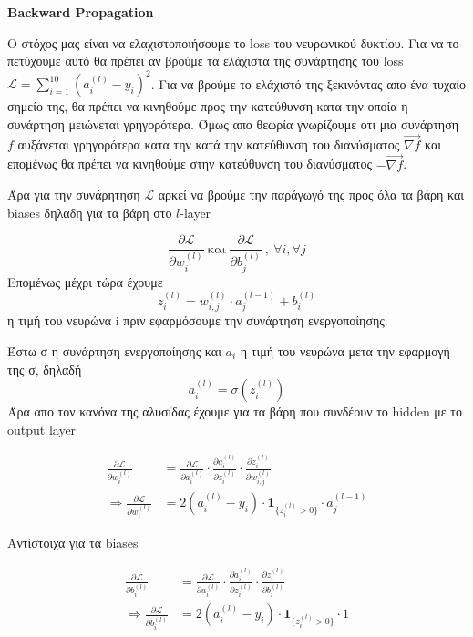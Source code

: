 \documentclass[a4paper,12pt]{article}
\begin{document}
\newpage
\section*{}
\begin{center}
    \Large \textbf{Backward Propagation}
\end{center}

Ο στόχος μας είναι να ελαχιστοποιήσουμε το loss του νευρωνικού δυκτίου. Για να το πετύχουμε αυτό θα πρέπει αν βρούμε τα ελάχιστα της συνάρτησης του loss $\mathcal{L} = \sum_{i=1}^{10} (a_i^{(l)} - y_i)^2$. Για να βρούμε το ελάχιστό της ξεκινόντας απο ένα τυχαίο σημείο της, θα πρέπει να κινηθούμε προς την κατεύθυνση κατα την οποία η συνάρτηση μειώνεται γρηγορότερα.  Όμως απο θεωρία γνωρίζουμε οτι μια συνάρτηση $f$ αυξάνεται γρηγορότερα κατα την κατά την κατεύθυνση του διανύσματος $\overrightarrow{\nabla f}$ και επομένως θα πρέπει να κινηθούμε στην κατεύθυνση του διανύσματος $-\overrightarrow{\nabla f}$. 

Άρα για την συνάρητηση $\mathcal{L}$ αρκεί να βρούμε την παράγωγό της προς όλα τα βάρη και biases δηλαδη για τα βάρη στο $l$-layer

$$
\frac{\partial \mathcal{L}}{\partial w_{i}^{(l)}}  \    \text{και} \  \frac{\partial \mathcal{L}}{\partial b_{j}^{(l)}}
\ , \ \forall i , \forall j
$$
Επομένως μέχρι τώρα έχουμε
\[
z_{i}^{(l)} = w_{i,j}^{(l)} \cdot a_{j}^{(l-1)} + b_{i}^{(l)}
\]
η τιμή του νευρώνα i πριν εφαρμόσουμε την συνάρτηση ενεργοποίησης.

Έστω σ η συνάρτηση ενεργοποίησης και $a_i$ η τιμή του νευρώνα μετα την εφαρμογή της σ, δηλαδή
\[
a_{i}^{(l)} = σ(z_{i}^{(l)})
\]
Άρα απο τον κανόνα της αλυσίδας έχουμε για τα βάρη που συνδέουν το hidden με το output layer

\begin{align}
\frac{\partial \mathcal{L}}{\partial w_{i}^{(l)}}  &= \frac{\partial \mathcal{L}}{\partial a_{i}^{(l)}}  \cdot \frac{\partial a_{i}^{(l)}}{\partial z_{i}^{(l)}}  \cdot \frac{\partial z_{i}^{(l)}}{\partial w_{i,j}^{(l)}} \label{eq:grad_weight_l1} \\
\Rightarrow \frac{\partial \mathcal{L}}{\partial w_{i}^{(l)}} &= 2(a_i^{(l)} - y_{i}) \cdot \mathbf{1}_{\{z_{i}^{(l)}>0\} } \cdot a_{j}^{(l-1)} \label{eq:grad_weight_l2}
\end{align}

Αντίστοιχα για τα biases

\begin{align}
\frac{\partial \mathcal{L}}{\partial b_{i}^{(l)}}  &= \frac{\partial \mathcal{L}}{\partial a_{i}^{(l)}}  \cdot \frac{\partial a_{i}^{(l)}}{\partial z_{i}^{(l)}}  \cdot \frac{\partial z_{i}^{(l)}}{\partial b_{i}^{(l)}} \label{eq:grad_bias_l1} \\
\Rightarrow \frac{\partial \mathcal{L}}{\partial b_{i}^{(l)}} &= 2(a_i^{(l)} - y_{i}) \cdot \mathbf{1}_{\{z_{i}^{(l)}>0\} } \cdot 1 \label{eq:grad_bias_l2}
\end{align}
\end{document}
